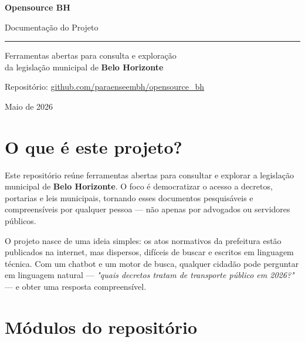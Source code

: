 \documentclass[12pt,a4paper]{article}
\begin{document}
\begin{titlepage}
  \centering
  \vspace*{3cm}
  {\Huge\bfseries\color{bhblue} Opensource BH\par}
  \vspace{0.5cm}
  {\Large\color{bhgray} Documentação do Projeto\par}
  \vspace{2cm}
  \rule{0.6\linewidth}{1pt}\par
  \vspace{1.5cm}
  {\large
    Ferramentas abertas para consulta e exploração\\
    da legislação municipal de \textbf{Belo Horizonte}
  \par}
  \vspace{3cm}
  {\normalsize
    Repositório: \href{https://github.com/paraenseembh/opensource_bh}%
    {github.com/paraenseembh/opensource\_bh}\par
  }
  \vfill
  {\small\color{bhgray} Maio de 2026}
\end{titlepage}

\tableofcontents
\newpage

\section{O que é este projeto?}

Este repositório reúne ferramentas abertas para consultar e explorar a legislação municipal de \textbf{Belo Horizonte}. O foco é democratizar o acesso a decretos, portarias e leis municipais, tornando esses documentos pesquisáveis e compreensíveis por qualquer pessoa --- não apenas por advogados ou servidores públicos.

O projeto nasce de uma ideia simples: os atos normativos da prefeitura estão publicados na internet, mas dispersos, difíceis de buscar e escritos em linguagem técnica. Com um chatbot e um motor de busca, qualquer cidadão pode perguntar em linguagem natural --- \textit{"quais decretos tratam de transporte público em 2026?"} --- e obter uma resposta compreensível.

\section{Módulos do repositório}
\end{document}

